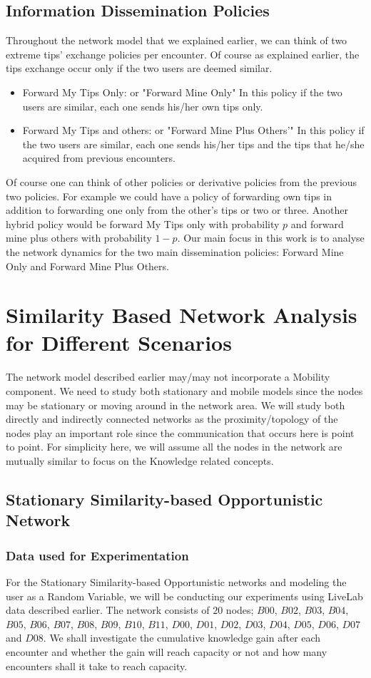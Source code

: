 \documentclass[11pt]{article}
\begin{document}
\subsection{Information Dissemination Policies}
Throughout the network model that we explained earlier, we can think of two extreme tips' exchange policies per encounter. Of course as explained earlier, the tips exchange occur only if the two users are deemed similar.
\begin{itemize}
\item Forward My Tips Only: or "Forward Mine Only" In this policy if the two users are similar, each one sends his/her own tips only.
\item Forward My Tips and others: or "Forward Mine Plus Others'" In this policy if the two users are similar, each one sends his/her tips and the tips that he/she acquired from previous encounters.
\end{itemize}
Of course one can think of other policies or derivative policies from the previous two policies. For example we could have a policy of forwarding own tips in addition to forwarding one only from the other's tips or two or three. Another hybrid policy would be forward My Tips only with probability $p$ and forward mine plus others with probability $1-p$.
Our main focus in this work is to analyse the network dynamics for the two main dissemination policies: Forward Mine Only and Forward Mine Plus Others.
\section{Similarity Based Network Analysis for Different Scenarios}
The network model described earlier may/may not incorporate a Mobility component. We need to study both stationary and mobile models since the nodes may be stationary or moving around in the network area. We will study both directly and indirectly connected networks as the proximity/topology of the nodes play an important role since the communication that occurs here is point to point. For simplicity here, we will assume all the nodes in the network are mutually similar to focus on the Knowledge related concepts.
\subsection{Stationary Similarity-based Opportunistic Network}

\subsubsection{Data used for Experimentation}
For the Stationary Similarity-based Opportunistic networks and modeling the user as a Random Variable, we will be conducting our experiments using LiveLab data \cite{data} described earlier. The network consists of $20$ nodes;  $B00$, $B02$, $B03$,
$B04$, $B05$, $B06$, $B07$, $B08$, $B09$, $B10$, $B11$, $D00$, $D01$, $D02$, $D03$, $D04$, $D05$, $D06$, $D07$ and $D08$. We shall investigate the cumulative knowledge gain after each encounter and whether the gain will reach capacity or not and how many encounters shall it take to reach capacity.
\end{document}
